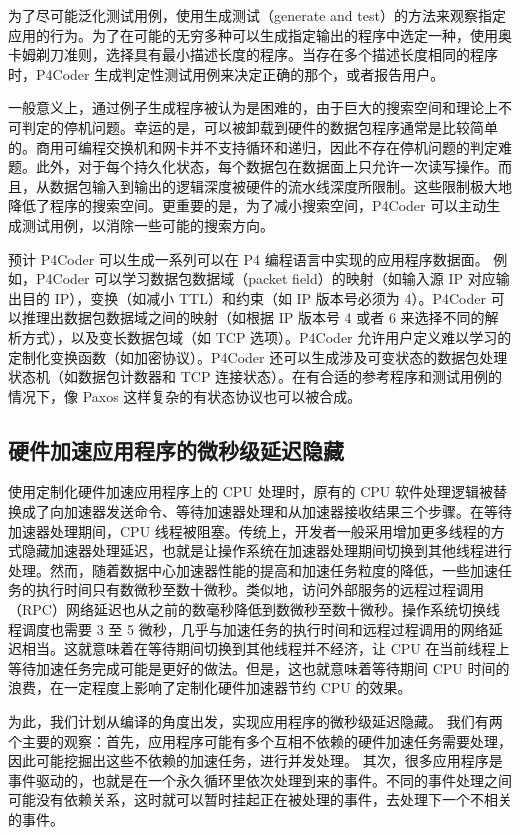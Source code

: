 为了尽可能泛化测试用例，使用生成测试（generate and test）的方法来观察指定应用的行为。为了在可能的无穷多种可以生成指定输出的程序中选定一种，使用奥卡姆剃刀准则，选择具有最小描述长度的程序。当存在多个描述长度相同的程序时，P4Coder 生成判定性测试用例来决定正确的那个，或者报告用户。

一般意义上，通过例子生成程序被认为是困难的，由于巨大的搜索空间和理论上不可判定的停机问题。幸运的是，可以被卸载到硬件的数据包程序通常是比较简单的。商用可编程交换机和网卡并不支持循环和递归，因此不存在停机问题的判定难题。此外，对于每个持久化状态，每个数据包在数据面上只允许一次读写操作。而且，从数据包输入到输出的逻辑深度被硬件的流水线深度所限制。这些限制极大地降低了程序的搜索空间。更重要的是，为了减小搜索空间，P4Coder 可以主动生成测试用例，以消除一些可能的搜索方向。

预计 P4Coder 可以生成一系列可以在 P4 编程语言中实现的应用程序数据面。
例如，P4Coder 可以学习数据包数据域（packet field）的映射（如输入源 IP 对应输出目的 IP），变换（如减小 TTL）和约束（如 IP 版本号必须为 4）。P4Coder 可以推理出数据包数据域之间的映射（如根据 IP 版本号 4 或者 6 来选择不同的解析方式），以及变长数据包域（如 TCP 选项）。P4Coder 允许用户定义难以学习的定制化变换函数（如加密协议）。P4Coder 还可以生成涉及可变状态的数据包处理状态机（如数据包计数器和 TCP 连接状态）。在有合适的参考程序和测试用例的情况下，像 Paxos 这样复杂的有状态协议也可以被合成。

\subsection{硬件加速应用程序的微秒级延迟隐藏}

使用定制化硬件加速应用程序上的 CPU 处理时，原有的 CPU 软件处理逻辑被替换成了向加速器发送命令、等待加速器处理和从加速器接收结果三个步骤。在等待加速器处理期间，CPU 线程被阻塞。传统上，开发者一般采用增加更多线程的方式隐藏加速器处理延迟，也就是让操作系统在加速器处理期间切换到其他线程进行处理。然而，随着数据中心加速器性能的提高和加速任务粒度的降低，一些加速任务的执行时间只有数微秒至数十微秒。类似地，访问外部服务的远程过程调用（RPC）网络延迟也从之前的数毫秒降低到数微秒至数十微秒。操作系统切换线程调度也需要 3 至 5 微秒，几乎与加速任务的执行时间和远程过程调用的网络延迟相当。这就意味着在等待期间切换到其他线程并不经济，让 CPU 在当前线程上等待加速任务完成可能是更好的做法。但是，这也就意味着等待期间 CPU 时间的浪费，在一定程度上影响了定制化硬件加速器节约 CPU 的效果。

为此，我们计划从编译的角度出发，实现应用程序的微秒级延迟隐藏。
我们有两个主要的观察：首先，应用程序可能有多个互相不依赖的硬件加速任务需要处理，因此可能挖掘出这些不依赖的加速任务，进行并发处理。
其次，很多应用程序是事件驱动的，也就是在一个永久循环里依次处理到来的事件。不同的事件处理之间可能没有依赖关系，这时就可以暂时挂起正在被处理的事件，去处理下一个不相关的事件。

